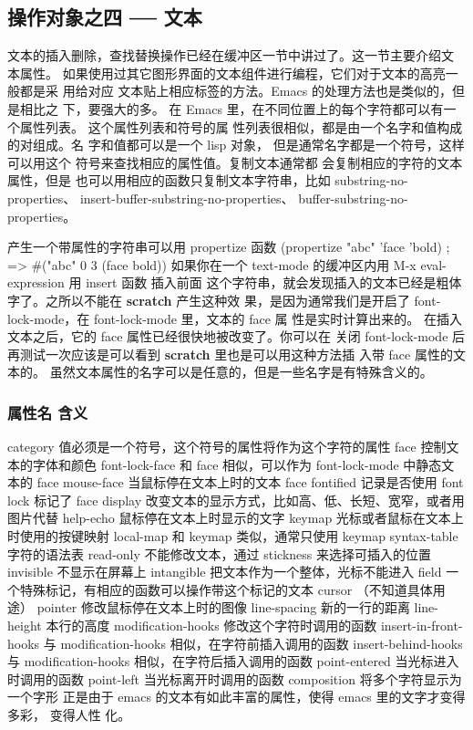 \documentclass[11pt]{ctexart}
\begin{document}
{{{{\subsection{操作对象之四 ── 文本}
\label{sec:orgb379b31}

文本的插入删除，查找替换操作已经在缓冲区一节中讲过了。这一节主要介绍文 本属性。
如果使用过其它图形界面的文本组件进行编程，它们对于文本的高亮一般都是采 用给对应
文本贴上相应标签的方法。Emacs 的处理方法也是类似的，但是相比之 下，要强大的多。
在 Emacs 里，在不同位置上的每个字符都可以有一个属性列表。 这个属性列表和符号的属
性列表很相似，都是由一个名字和值构成的对组成。名 字和值都可以是一个 lisp 对象，
但是通常名字都是一个符号，这样可以用这个 符号来查找相应的属性值。复制文本通常都
会复制相应的字符的文本属性，但是 也可以用相应的函数只复制文本字符串，比如
substring-no-properties、 insert-buffer-substring-no-properties、
buffer-substring-no-properties。

产生一个带属性的字符串可以用 propertize 函数
(propertize "abc" 'face 'bold)          ; => \#("abc" 0 3 (face bold))
如果你在一个 text-mode 的缓冲区内用 M-x eval-expression 用 insert 函数 插入前面
这个字符串，就会发现插入的文本已经是粗体字了。之所以不能在 \textbf{scratch} 产生这种效
果，是因为通常我们是开启了 font-lock-mode，在 font-lock-mode 里，文本的 face 属
性是实时计算出来的。 在插入文本之后，它的 face 属性已经很快地被改变了。你可以在
关闭 font-lock-mode 后再测试一次应该是可以看到 \textbf{scratch} 里也是可以用这种方法插
入带 face 属性的文本的。
虽然文本属性的名字可以是任意的，但是一些名字是有特殊含义的。

\subsubsection{属性名	含义}
\label{sec:org0d46de0}

category	值必须是一个符号，这个符号的属性将作为这个字符的属性
face	控制文本的字体和颜色
font-lock-face	和 face 相似，可以作为 font-lock-mode 中静态文本的 face
mouse-face	当鼠标停在文本上时的文本 face
fontified	记录是否使用 font lock 标记了 face
display	改变文本的显示方式，比如高、低、长短、宽窄，或者用图片代替
help-echo	鼠标停在文本上时显示的文字
keymap	光标或者鼠标在文本上时使用的按键映射
local-map	和 keymap 类似，通常只使用 keymap
syntax-table	字符的语法表
read-only	不能修改文本，通过 stickness 来选择可插入的位置
invisible	不显示在屏幕上
intangible	把文本作为一个整体，光标不能进入
field	一个特殊标记，有相应的函数可以操作带这个标记的文本
cursor	（不知道具体用途）
pointer	修改鼠标停在文本上时的图像
line-spacing	新的一行的距离
line-height	本行的高度
modification-hooks	修改这个字符时调用的函数
insert-in-front-hooks	与 modification-hooks 相似，在字符前插入调用的函数
insert-behind-hooks	与 modification-hooks 相似，在字符后插入调用的函数
point-entered	当光标进入时调用的函数
point-left	当光标离开时调用的函数
composition	将多个字符显示为一个字形
正是由于 emacs 的文本有如此丰富的属性，使得 emacs 里的文字才变得多彩， 变得人性
化。

}}}}
\end{document}
